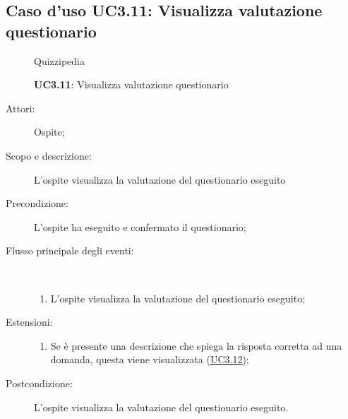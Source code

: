\subsection{Caso d'uso UC3.11: Visualizza valutazione questionario}
\begin{figure}[H]
	\centering
	\begin{resizedtikzpicture}{\textwidth}
		\begin{umlsystem}[x=0, fill=lightgray!20]{Quizzipedia}
		\end{umlsystem}
	\end{resizedtikzpicture}
	\caption{\textbf{UC3.11}: Visualizza valutazione questionario}
	\label{UC3.11}
\end{figure}
\begin{description}
	\item[Attori:] Ospite;
	\item[Scopo e descrizione:] L'ospite visualizza la valutazione del questionario eseguito
	\item[Precondizione:] L'ospite ha eseguito e confermato il questionario;
	
	\item[Flusso principale degli eventi:] \ 
	\begin{enumerate}
		\item L'ospite visualizza la valutazione del questionario eseguito;
		
	\end{enumerate}
	\item[Estensioni:]
	\begin{enumerate}
		\item Se è presente una descrizione che spiega la risposta corretta ad una domanda, questa viene visualizzata (\hyperlink{UC3.12}{UC3.12});
		
	\end{enumerate}
	\item[Postcondizione:] L'ospite visualizza la valutazione del questionario eseguito.
\end{description}
\hypertarget{UC3.12}{}
